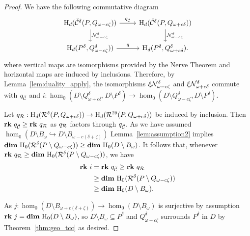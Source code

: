 \begin{proof}
  We have the following commutative diagram
  \[\begin{tikzcd}
    \hom_d(\cech^\delta(P, Q_{\omega-c\zeta})) \arrow{r}{q_{\cech}}\arrow{d}{\N_{\omega-c\zeta}^{\delta}} &
    \hom_d(\cech^\delta(P, Q_{\omega+c\delta})) \arrow{d}{\N_{\omega-c\zeta}^\delta}\\
    \hom_d(P^\delta, Q_{\omega-c\zeta}^\delta))\arrow{r}{q} &
    \hom_d(P^\delta, Q_{\omega+c\delta}^\delta).
  \end{tikzcd}\]
  where vertical maps are isomorphisms provided by the Nerve Theorem and horizontal maps are induced by inclusions.
  Therefore, by Lemma~\ref{lem:duality_apply}, the isomorphisms $\xi\mathcal{N}_{\omega-c\zeta}^\delta$ and $\xi\mathcal{N}_{\omega+c\delta}^\delta$ commute with $q_{\check{\mathcal{C}}}$ and $i : \hom_0(D\setminus Q_{\omega+c\delta}^\delta, D\setminus P^\delta)\to \hom_0(D\setminus Q_{\omega-c\zeta}^\delta, D\setminus P^\delta)$.

  Let $q_{\mathcal{R}} : \mathrm{H}_d(\mathcal{R}^{\delta}(P, Q_{\omega+c\delta}))\to\mathrm{H}_d(\mathcal{R}^{2\delta}(P, Q_{\omega+c\delta}))$ be induced by inclusion.
  Then $\mathbf{rk}~q_{\check{\mathcal{C}}} \geq\mathbf{rk}~q_{\mathcal{R}}$ as $q_{\mathcal{R}}$ factors through $q_{\check{\mathcal{C}}}$.
  As we have assumed $\hom_0(D\setminus B_\omega\hookrightarrow D\setminus B_{\omega-c(\delta+\zeta)})$ Lemma~\ref{lem:assumption2} implies $\mathbf{dim}~\mathrm{H}_0(\mathcal{R}^\delta(P\setminus Q_{\omega-c\zeta}))\geq \mathbf{dim}~\mathrm{H}_0(D\setminus B_\omega)$.
  It follows that, whenever $\mathbf{rk}~q_{\mathcal{R}} \geq \mathbf{dim}~\mathrm{H}_0(\mathcal{R}^\delta(P\setminus Q_{\omega-c\zeta}))$, we have
  \begin{align*}
    \mathbf{rk}~i &= \mathbf{rk}~q_{\check{\mathcal{C}}} \geq \mathbf{rk}~q_{\mathcal{R}}\\
      &\geq \mathbf{dim}~\mathrm{H}_0(\mathcal{R}^\delta(P\setminus Q_{\omega-c\zeta}))\\
      &\geq \mathbf{dim}~\mathrm{H}_0(D\setminus B_\omega).
  \end{align*}

  As $j : \hom_0(D\setminus B_{\omega+c(\delta+\zeta)})\to \hom_0(D\setminus B_\omega)$ is surjective by assumption $\mathbf{rk}~j = \mathbf{dim}~\mathrm{H}_0(D\setminus B_\omega)$, so $D\setminus B_\omega\subseteq P^\delta$ and $Q_{\omega-c\zeta}^\delta$ surrounds $P^\delta$ in $D$ by Theorem~\ref{thm:geo_tcc} as desired.
\end{proof}
